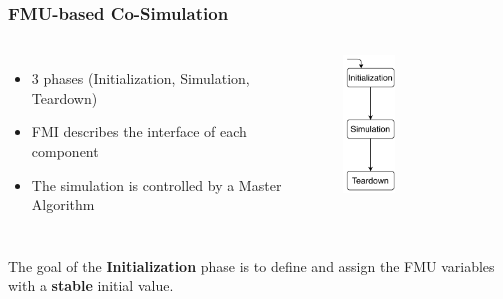 \documentclass{beamer}
\begin{document}
\begin{frame}
\frametitle{FMU-based Co-Simulation}
\begin{columns}
\begin{itemize}
    \item 3 phases (Initialization, Simulation, Teardown)
    \item FMI describes the interface of each component
    \item The simulation is controlled by a Master Algorithm
\end{itemize}
\begin{figure}
    \centering
    \includegraphics[width=0.4\textwidth]{images/initializationCoSim.pdf}
\end{figure}
\end{columns}

The goal of the \textbf{Initialization} phase is to define and assign the FMU variables with a \textbf{stable} initial value.
\end{frame}
\end{document}
